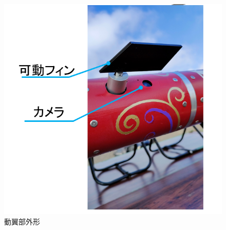 \documentclass[a4paper,11pt,uplatex]{jsarticle}
\begin{document}
\begin{figure}[H]
	\centering
	\includegraphics[scale = 0.55]{pic_str/s_r_outer_2.png}
	\caption{動翼部外形}
	\label{s_r_outer}
\end{figure}
\end{document}
